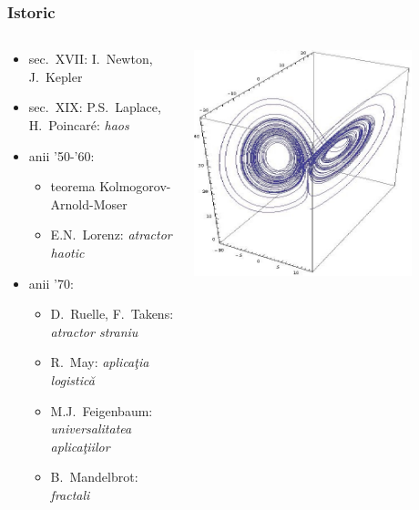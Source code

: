 \documentclass[a4,compress,handout]{beamer}
\newcommand{\ab}{\u{a}}
\newcommand{\tb}{\c{t}}
\begin{document}
\begin{frame}
	\frametitle{Istoric}
	
	
	\begin{columns}[c]
		\begin{column}{0.7\textwidth}
			\begin{itemize}
				\item { \small sec.\ XVII:  I.\ Newton, J.\ Kepler}
				\item  { \small sec.\ XIX: P.S.\ Laplace, {\color{blue}H.\ Poincar\'{e}:} }{\it \color{darkblue} haos}
				\item anii '50-'60: 
				\begin{itemize}
					\item  	teorema Kolmogorov-Arnold-Moser
					\item E.N.\ Lorenz: {\it \color{darkblue} atractor haotic}
				\end{itemize}
				\item anii '70: 
				\begin{itemize}
					\item  	D.\ Ruelle, F.\ Takens: {\it \color{darkblue} atractor straniu}
					\item R.\ May: 
					{\it \color{darkblue} aplica\tb ia logistic\ab\ }
					\item M.J.\ Feigenbaum:
					{\it \color{darkblue} universalitatea aplica\tb iilor}
					\item B.\ Mandelbrot:
					{\it \color{darkblue} fractali}
				\end{itemize}	 
			\end{itemize}
			
		\end{column}
		\begin{column}{0.3\textwidth}
			
			
			\hfill\includegraphics[width=0.8\textwidth]{lorenzstrangeatractor}\hspace*{\fill}
			

\end{column}
\end{columns}
\end{frame}
\end{document}
